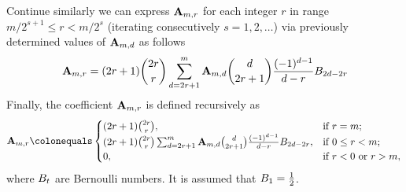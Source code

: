Continue similarly we can express ${\mathbf{A}} \sb{m,r}$ for each integer $r$ in range $m/2^{s+1}\leq r < m/2^s$
(iterating consecutively $s=1,2,\ldots$) via previously determined values of ${\mathbf{A}} \sb{m,d}$ as follows
\begin{equation}
    {\mathbf{A}} \sb{m,r} =
    (2r+1) \binom{2r}{r} \sum_{d=2r+1}^{m} {\mathbf{A}} \sb{m,d} \binom{d}{2r+1} \frac{(-1)^{d-1}}{d-r}
    {B}\sb{2d-2r}\label{eq:equation12}
\end{equation}
Finally, the coefficient ${\mathbf{A}} \sb{m,r}$ is defined recursively as
\begin{equation}
    \label{eq:def_coeff_a}
    \coeffA{m}{r} \colonequals
    \begin{cases}
    (2r+1)
        \binom{2r}{r}, & \text{if } r=m; \\
        (2r+1) \binom{2r}{r} \sum_{d=2r+1}^{m} \coeffA{m}{d} \binom{d}{2r+1} \frac{(-1)^{d-1}}{d-r}
        \bernoulli{2d-2r}, & \text{if } 0 \leq r<m; \\
        0, & \text{if } r<0 \text{ or } r>m,
    \end{cases}
\end{equation}
where ${B}\sb{t}$ are Bernoulli numbers.
It is assumed that ${B}\sb{1}=\frac{1}{2}$.
